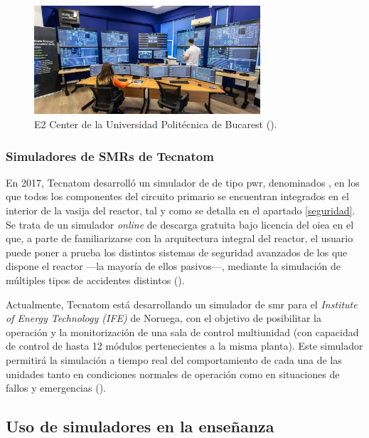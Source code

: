 \begin{figure}[h!]
  \centering
  \includegraphics[width=0.75\textwidth]{content/figures/e2_center_bucarest.png}
  \caption{E2 Center de la Universidad Politécnica de Bucarest (\cite{e2_center_romania}).}
  \label{fig:e2_center_bucarest}
\end{figure}

\subsubsection{Simuladores de SMRs de Tecnatom}

En 2017, Tecnatom desarrolló un simulador de  de tipo \acrshort{pwr}, denominados , en los que todos los componentes del circuito primario se encuentran integrados en el interior de la vasija del reactor, tal y como se detalla en el apartado \ref{seguridad}. Se trata de un simulador \textit{online} de descarga gratuita bajo licencia del \acrshort{oiea} en el que, a parte de familiarizarse con la arquitectura integral del reactor, el usuario puede poner a prueba los distintos sistemas de seguridad avanzados de los que dispone el reactor ---la mayoría de ellos pasivos---, mediante la simulación de múltiples tipos de accidentes distintos (\cite{ipwr_iaea}).

Actualmente, Tecnatom está desarrollando un simulador de \acrshort{smr} para el \textit{Institute of Energy Technology (IFE)} de Noruega, con el objetivo de posibilitar la operación y la monitorización de una sala de control multiunidad (con capacidad de control de hasta 12 módulos pertenecientes a la misma planta). Este simulador permitirá la simulación a tiempo real del comportamiento de cada una de las unidades tanto en condiciones normales de operación como en situaciones de fallos y emergencias (\cite{tecnatom_smr_simulator}). 


\subsection{Uso de simuladores en la enseñanza}

